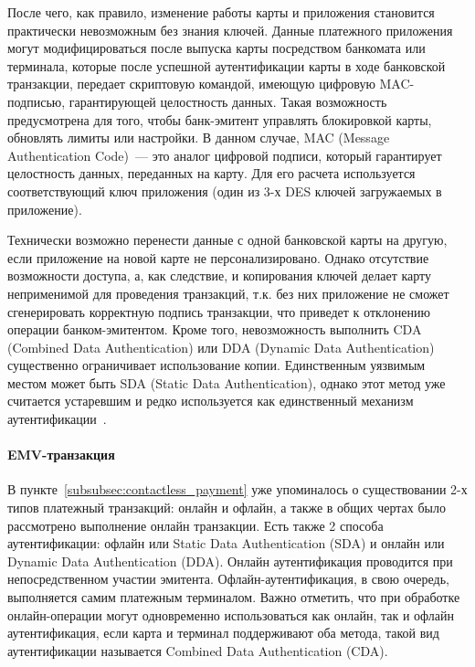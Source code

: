 После чего, как правило, изменение работы карты и приложения становится практически невозможным без знания ключей.
Данные платежного приложения могут модифицироваться после выпуска карты посредством банкомата или терминала, которые после успешной аутентификации карты в ходе банковской транзакции, передает скриптовую командой, имеющую цифровую MAC-подписью, гарантирующей целостность данных.
Такая возможность предусмотрена для того, чтобы  банк-эмитент управлять блокировкой карты, обновлять лимиты или настройки.
В данном случае, MAC (Message Authentication Code)~--- это аналог цифровой подписи, который гарантирует целостность данных, переданных на карту.
Для его расчета используется соответствующий ключ приложения (один из 3-х DES ключей загружаемых в приложение).

Технически возможно перенести данные с одной банковской карты на другую, если приложение на новой карте не персонализировано.
Однако отсутствие возможности доступа, а, как следствие, и копирования ключей делает карту неприменимой для проведения транзакций, т.к. без них приложение не сможет сгенерировать корректную подпись транзакции, что приведет к отклонению операции банком-эмитентом.
Кроме того, невозможность выполнить CDA (Combined Data Authentication) или DDA (Dynamic Data Authentication) существенно ограничивает использование копии.
Единственным уязвимым местом может быть SDA (Static Data Authentication), однако этот метод уже считается устаревшим и редко используется как единственный механизм аутентификации~\cite{emv_card_mechanism}.


\paragraph{EMV-транзакция}
\label{par:emv_transaction}

В пункте~\ref{subsubsec:contactless_payment} уже упоминалось о существовании 2-х типов платежный транзакций: онлайн и офлайн, а также в общих чертах было рассмотрено выполнение онлайн транзакции.
Есть также 2 способа аутентификации: офлайн или Static Data Authentication (SDA) и онлайн или Dynamic Data Authentication (DDA).
Онлайн аутентификация проводится при непосредственном участии эмитента.
Офлайн-аутентификация, в свою очередь, выполняется самим платежным терминалом.
Важно отметить, что при обработке онлайн-операции могут одновременно использоваться как онлайн, так и офлайн аутентификация, если карта и терминал поддерживают оба метода, такой вид аутентификации называется Combined Data Authentication (CDA).

